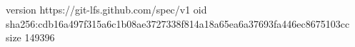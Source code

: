 version https://git-lfs.github.com/spec/v1
oid sha256:cdb16a497f315a6c1b08ae3727338f814a18a65ea6a37693fa446ec8675103cc
size 149396
